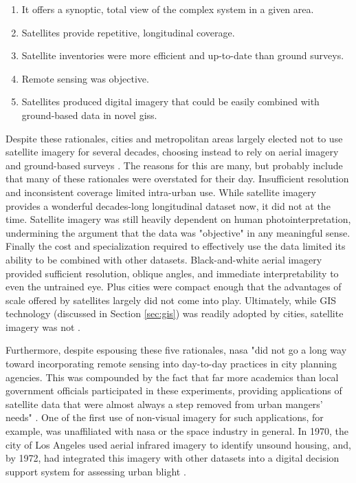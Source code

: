 \begin{enumerate}[itemsep=0pt,parsep=0pt]
	\item{It offers a synoptic, total view of the complex system in a given area.}
	\item{Satellites provide repetitive, longitudinal coverage.}
	\item{Satellite inventories were more efficient and up-to-date than ground surveys.}
	\item{Remote sensing was objective.}
	\item{Satellites produced digital imagery that could be easily combined with ground-based data in novel \acp{gis}.}
\end{enumerate}

Despite these rationales, cities and metropolitan areas largely elected not to use satellite imagery for several decades, choosing instead to rely on aerial imagery and ground-based surveys \cite{lightWarfareWelfareDefense2005}. The reasons for this are many, but probably include that many of these rationales were overstated for their day. Insufficient resolution and inconsistent coverage limited intra-urban use. While satellite imagery provides a wonderful decades-long longitudinal dataset now, it did not at the time. Satellite imagery was still heavily dependent on human photointerpretation, undermining the argument that the data was "objective" in any meaningful sense. Finally the cost and specialization required to effectively use the data limited its ability to be combined with other datasets. Black-and-white aerial imagery provided sufficient resolution, oblique angles, and immediate interpretability to even the untrained eye. Plus cities were compact enough that the advantages of scale offered by satellites largely did not come into play. Ultimately, while GIS technology (discussed in Section \ref{sec:gis}) was readily adopted by cities, satellite imagery was not \cite{lightWarfareWelfareDefense2005}.

Furthermore, despite espousing these five rationales, \ac{nasa} "did not go a long way toward incorporating remote sensing into day-to-day practices in city planning agencies. This was compounded by the fact that far more academics than local government officials participated in these experiments, providing applications of satellite data that were almost always a step removed from urban mangers' needs" \cite{lightWarfareWelfareDefense2005}. One of the first use of non-visual imagery for such applications, for example, was unaffiliated with \ac{nasa} or the space industry in general. In 1970, the city of Los Angeles used aerial infrared imagery to identify unsound housing, and, by 1972, had integrated this imagery with other datasets into a digital decision support system for assessing urban blight \cite{lightWarfareWelfareDefense2005}.

